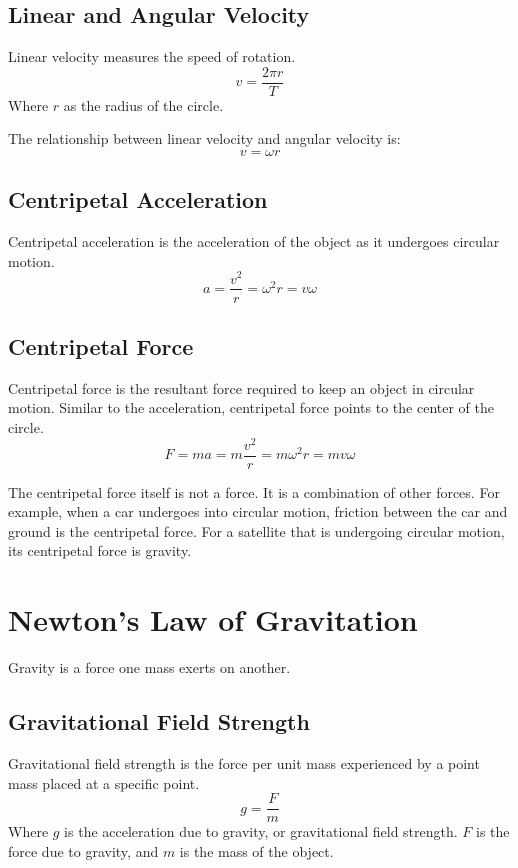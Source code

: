 \documentclass[../notes.tex]{subfiles}
\begin{document}
\subsection{Linear and Angular Velocity}
Linear velocity measures the speed of rotation.
\begin{equation}
	v = \frac{2 \pi r}{T}
\end{equation}
Where $r$ as the radius of the circle.

The relationship between linear velocity and angular velocity is:
\begin{equation}
	v = \omega r
\end{equation}

\subsection{Centripetal Acceleration}
Centripetal acceleration is the acceleration of the object as it undergoes circular motion.
\begin{equation}
	a = \frac{v^2}{r} = \omega^2 r = v\omega
\end{equation}

\subsection{Centripetal Force}
Centripetal force is the resultant force required to keep an object in circular motion.
Similar to the acceleration, centripetal force points to the center of the circle.
\begin{equation}
	F = ma = m \frac{v^2}{r} = m \omega^2 r = mv\omega
\end{equation}

The centripetal force itself is not a force. 
It is a combination of other forces.
For example, when a car undergoes into circular motion, friction between the car and ground is the centripetal force.
For a satellite that is undergoing circular motion, its centripetal force is gravity. 

\section{Newton's Law of Gravitation}
Gravity is a force one mass exerts on another.

\subsection{Gravitational Field Strength}
Gravitational field strength is the force per unit mass experienced by a point mass placed at a specific point.
\begin{equation}
	g = \frac{F}{m}
\end{equation}
Where $g$ is the acceleration due to gravity, or gravitational field strength.
$F$ is the force due to gravity, and $m$ is the mass of the object.
\end{document}
